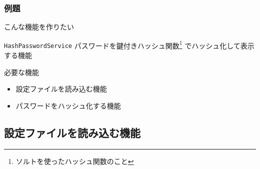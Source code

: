 \begin{frame}
  \frametitle{例題}

  こんな機能を作りたい

  \pause

  \begin{exampleblock}{\texttt{HashPasswordService}}
    パスワードを鍵付きハッシュ関数\footnote[frame]{ソルトを使ったハッシュ関数のこと}%
    でハッシュ化して表示する機能
  \end{exampleblock}

  \pause

  \begin{block}{必要な機能}
    \begin{itemize}
      \item<4-> 設定ファイルを読み込む機能
      \item<5-> パスワードをハッシュ化する機能
    \end{itemize}
  \end{block}

  \begin{center}
  \end{center}
\end{frame}

\subsection{設定ファイルを読み込む機能}


